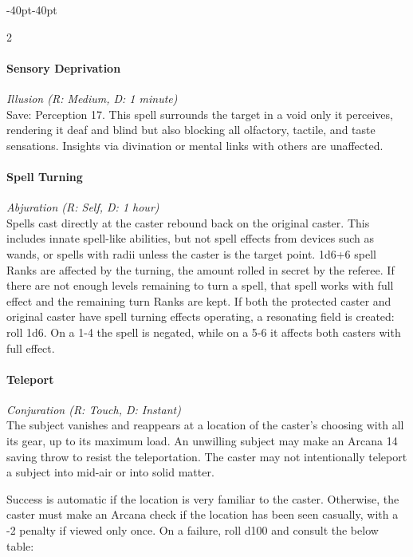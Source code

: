 \documentclass{book}
\begin{document}
\begin{adjustwidth}{-40pt}{-40pt}
\begin{multicols}{2}
\paragraph{Sensory Deprivation}\label{sensory-deprivation}

\emph{Illusion (R: Medium, D: 1 minute)}\\
Save: Perception 17. This spell surrounds the target in a void only it
perceives, rendering it deaf and blind but also blocking all olfactory,
tactile, and taste sensations. Insights via divination or mental links
with others are unaffected.

\paragraph{Spell Turning}\label{spell-turning}

\emph{Abjuration (R: Self, D: 1 hour)}\\
Spells cast directly at the caster rebound back on the original caster.
This includes innate spell-like abilities, but not spell effects from
devices such as wands, or spells with radii unless the caster is the
target point. 1d6+6 spell Ranks are affected by the turning, the amount
rolled in secret by the referee. If there are not enough levels
remaining to turn a spell, that spell works with full effect and the
remaining turn Ranks are kept. If both the protected caster and original
caster have spell turning effects operating, a resonating field is
created: roll 1d6. On a 1-4 the spell is negated, while on a 5-6 it
affects both casters with full effect.

\paragraph{Teleport}\label{teleport}

\emph{Conjuration (R: Touch, D: Instant)}\\
The subject vanishes and reappears at a location of the caster's
choosing with all its gear, up to its maximum load. An unwilling subject
may make an Arcana 14 saving throw to resist the teleportation. The
caster may not intentionally teleport a subject into mid-air or into
solid matter.

Success is automatic if the location is very familiar to the caster.
Otherwise, the caster must make an Arcana check if the location has been
seen casually, with a -2 penalty if viewed only once. On a failure, roll
d100 and consult the below table:


\end{multicols}
\end{adjustwidth}
\end{document}
